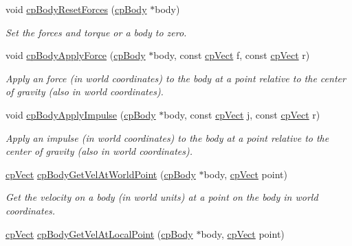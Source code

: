 \begin{DoxyCompactItemize}
\item 
\hypertarget{group__cp_body_ga55cecf4d82aa37cd626c2c208de48801}{void \hyperlink{group__cp_body_ga55cecf4d82aa37cd626c2c208de48801}{cp\-Body\-Reset\-Forces} (\hyperlink{structcp_body}{cp\-Body} $\ast$body)}\label{group__cp_body_ga55cecf4d82aa37cd626c2c208de48801}

\begin{DoxyCompactList}\small\item\em Set the forces and torque or a body to zero. \end{DoxyCompactList}\item 
\hypertarget{group__cp_body_ga201b11a766af3d8471ceaa3ae2ae85c9}{void \hyperlink{group__cp_body_ga201b11a766af3d8471ceaa3ae2ae85c9}{cp\-Body\-Apply\-Force} (\hyperlink{structcp_body}{cp\-Body} $\ast$body, const \hyperlink{structcp_vect}{cp\-Vect} f, const \hyperlink{structcp_vect}{cp\-Vect} r)}\label{group__cp_body_ga201b11a766af3d8471ceaa3ae2ae85c9}

\begin{DoxyCompactList}\small\item\em Apply an force (in world coordinates) to the body at a point relative to the center of gravity (also in world coordinates). \end{DoxyCompactList}\item 
\hypertarget{group__cp_body_ga1759ee27171704c75564ca3a414cf730}{void \hyperlink{group__cp_body_ga1759ee27171704c75564ca3a414cf730}{cp\-Body\-Apply\-Impulse} (\hyperlink{structcp_body}{cp\-Body} $\ast$body, const \hyperlink{structcp_vect}{cp\-Vect} j, const \hyperlink{structcp_vect}{cp\-Vect} r)}\label{group__cp_body_ga1759ee27171704c75564ca3a414cf730}

\begin{DoxyCompactList}\small\item\em Apply an impulse (in world coordinates) to the body at a point relative to the center of gravity (also in world coordinates). \end{DoxyCompactList}\item 
\hypertarget{group__cp_body_gad805b6e8a23a49428642295238d7bb9b}{\hyperlink{structcp_vect}{cp\-Vect} \hyperlink{group__cp_body_gad805b6e8a23a49428642295238d7bb9b}{cp\-Body\-Get\-Vel\-At\-World\-Point} (\hyperlink{structcp_body}{cp\-Body} $\ast$body, \hyperlink{structcp_vect}{cp\-Vect} point)}\label{group__cp_body_gad805b6e8a23a49428642295238d7bb9b}

\begin{DoxyCompactList}\small\item\em Get the velocity on a body (in world units) at a point on the body in world coordinates. \end{DoxyCompactList}\item 
\hypertarget{group__cp_body_ga00ceb0eede2419e84eb7e4b107fa0bd3}{\hyperlink{structcp_vect}{cp\-Vect} \hyperlink{group__cp_body_ga00ceb0eede2419e84eb7e4b107fa0bd3}{cp\-Body\-Get\-Vel\-At\-Local\-Point} (\hyperlink{structcp_body}{cp\-Body} $\ast$body, \hyperlink{structcp_vect}{cp\-Vect} point)}\label{group__cp_body_ga00ceb0eede2419e84eb7e4b107fa0bd3}


\end{DoxyCompactItemize}
